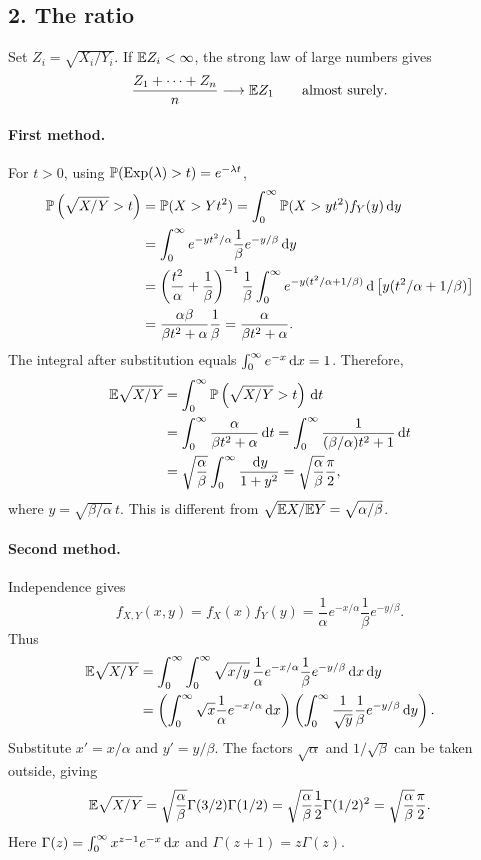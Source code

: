 \documentclass[11pt,a4paper]{article}
\begin{document}
\subsection*{2. The ratio}
Set $Z_i=\sqrt{X_i/Y_i}$. If $\E Z_i<\infty$, the strong law of large numbers gives
\[
\frac{Z_1+\cdots+Z_n}{n}\longrightarrow\E Z_1
\qquad\text{almost surely}.
\]
\paragraph{First method.} For $t>0$, using $\P(\operatorname{Exp}(\lambda)>t)=e^{-\lambda t}$,
\begin{align*}
\P\left(\sqrt{X/Y}>t\right)
&=\P(X>Yt^2)=\int_0^\infty\P(X>yt^2)f_Y(y)\d y\\
&=\int_0^\infty e^{-yt^2/\alpha}\frac1\beta e^{-y/\beta}\d y\\
&=\left(\frac{t^2}\alpha+\frac1\beta\right)^{-1}\frac1\beta
\int_0^\infty e^{-y(t^2/\alpha+1/\beta)}\d\left[y(t^2/\alpha+1/\beta)\right]\\
&=\frac{\alpha\beta}{\beta t^2+\alpha}\frac1\beta
=\frac\alpha{\beta t^2+\alpha}.
\end{align*}
The integral after substitution equals $\int_0^\infty e^{-x}\d x=1$. Therefore,
\begin{align*}
\E\sqrt{X/Y}
&=\int_0^\infty\P\left(\sqrt{X/Y}>t\right)\d t\\
&=\int_0^\infty\frac\alpha{\beta t^2+\alpha}\d t
=\int_0^\infty\frac1{(\beta/\alpha)t^2+1}\d t\\
&=\sqrt{\frac\alpha\beta}\int_0^\infty\frac{\d y}{1+y^2}
=\sqrt{\frac\alpha\beta}\frac\pi2,
\end{align*}
where $y=\sqrt{\beta/\alpha}\,t$. This is different from
$\sqrt{\E X/\E Y}=\sqrt{\alpha/\beta}$.

\paragraph{Second method.} Independence gives
\[
f_{X,Y}(x,y)=f_X(x)f_Y(y)=\frac1\alpha e^{-x/\alpha}\frac1\beta e^{-y/\beta}.
\]
Thus
\begin{align*}
\E\sqrt{X/Y}
&=\int_0^\infty\int_0^\infty\sqrt{x/y}\,
\frac1\alpha e^{-x/\alpha}\frac1\beta e^{-y/\beta}\d x\d y\\
&=\left(\int_0^\infty\sqrt x\frac1\alpha e^{-x/\alpha}\d x\right)
\left(\int_0^\infty\frac1{\sqrt y}\frac1\beta e^{-y/\beta}\d y\right).
\end{align*}
Substitute $x'=x/\alpha$ and $y'=y/\beta$. The factors $\sqrt\alpha$ and $1/\sqrt\beta$ can be taken outside, giving
\[
\E\sqrt{X/Y}=\sqrt{\frac\alpha\beta}\Gamma(3/2)\Gamma(1/2)
=\sqrt{\frac\alpha\beta}\frac12\Gamma(1/2)^2
=\sqrt{\frac\alpha\beta}\frac\pi2.
\]
Here $\Gamma(z)=\int_0^\infty x^{z-1}e^{-x}\d x$ and $\Gamma(z+1)=z\Gamma(z)$.
\end{document}
